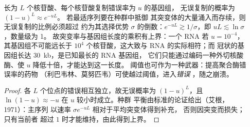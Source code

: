\begin{proposition}[错误阈值]\label{prop:b3:virology:error-threshold}
长为 $L$ 个核苷酸、每个核苷酸复制错误率为 $u$ 的基因组，
无误复制的概率为 $(1-u)^{L} \approx e^{-uL}$。
若最适序列要在种群中抵御
其突变体的大量涌入而存续，则无误复制的比例必须超过
约为其选择优势 $\sigma$ 的倒数：$e^{-uL} \gtrsim
1/\sigma$，即 $uL \lesssim \ln\sigma$，数量级为 1。
故突变率与基因组长度的乘积有上界：一个
RNA 若 $u = 10^{-4}$，其基因组不可能远长于
$10^{4}$ 个核苷酸，这大致与 RNA 的实际相符；而
冠状的基因组长达 \qty{30}{kb}，是已知最长的 RNA 基因组，
它们只能通过编码一种外切核酸酶、使 $u$ 降低十倍，才能达到这一长度。
阈值也可作为一种武器：提高聚合酶错误率的药物
（利巴韦林、莫努匹韦）可使越过阈值，进入\emph{错误
}，随之崩溃。
\end{proposition}
\begin{proof}
各 $L$ 个位点的错误相互独立，故无误概率为
$(1-u)^{L}$，且 $\ln(1-u) \approx -u$ 在 $u$ 较小时成立。种群
平衡由标准的论证给出（艾根，1971）：主序列
以速率 $\sigma e^{-uL}$ 相对于平均突变体得到补充，
否则因突变而损失；只有当前者
超过 $1$ 时才能维持，由此得到上界。
\end{proof}

